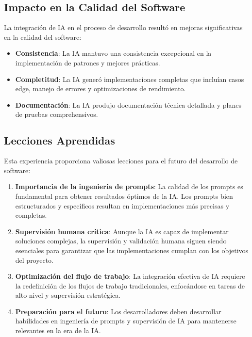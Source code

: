 \documentclass[12pt,a4paper]{article}
\begin{document}
\subsection{Impacto en la Calidad del Software}

La integración de IA en el proceso de desarrollo resultó en mejoras significativas en la calidad del software:

\begin{itemize}
    \item \textbf{Consistencia}: La IA mantuvo una consistencia excepcional en la implementación de patrones y mejores prácticas.
    
    \item \textbf{Completitud}: La IA generó implementaciones completas que incluían casos edge, manejo de errores y optimizaciones de rendimiento.
    
    \item \textbf{Documentación}: La IA produjo documentación técnica detallada y planes de pruebas comprehensivos.
\end{itemize}

\subsection{Lecciones Aprendidas}

Esta experiencia proporciona valiosas lecciones para el futuro del desarrollo de software:

\begin{enumerate}
    \item \textbf{Importancia de la ingeniería de prompts}: La calidad de los prompts es fundamental para obtener resultados óptimos de la IA. Los prompts bien estructurados y específicos resultan en implementaciones más precisas y completas.
    
    \item \textbf{Supervisión humana crítica}: Aunque la IA es capaz de implementar soluciones complejas, la supervisión y validación humana siguen siendo esenciales para garantizar que las implementaciones cumplan con los objetivos del proyecto.
    
    \item \textbf{Optimización del flujo de trabajo}: La integración efectiva de IA requiere la redefinición de los flujos de trabajo tradicionales, enfocándose en tareas de alto nivel y supervisión estratégica.
    
    \item \textbf{Preparación para el futuro}: Los desarrolladores deben desarrollar habilidades en ingeniería de prompts y supervisión de IA para mantenerse relevantes en la era de la IA.
\end{enumerate}
\end{document}
